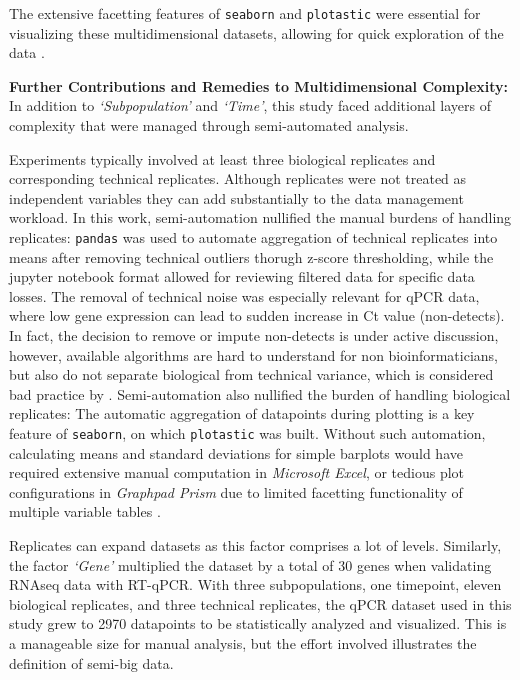 The extensive facetting features of \texttt{seaborn} and \texttt{plotastic} were
essential for visualizing these multidimensional datasets, allowing for quick
exploration of the data \cite{waskomSeabornStatisticalData2021}.


\textbf{Further Contributions and Remedies to Multidimensional Complexity:}
In addition to \textit{`Subpopulation'} and \textit{`Time'}, this study faced
additional layers of complexity that were managed through semi-automated
analysis.

Experiments typically involved at least three biological replicates
and corresponding technical replicates. Although replicates were not treated as
independent variables 
they can add substantially to the data management workload. In this work,
semi-automation nullified the manual burdens of handling replicates:
\texttt{pandas} was used to automate aggregation of technical replicates into
means after removing technical outliers thorugh z-score thresholding, while the
jupyter notebook format allowed for reviewing filtered data for specific data
losses. The removal of technical noise was especially relevant for qPCR data,
where low gene expression can lead to sudden increase in Ct value
(non-detects). In fact, the decision to remove or impute non-detects is under
active discussion, however, available algorithms are hard to understand for non
bioinformaticians, but also do not separate biological from technical variance,
which is considered bad practice by
\citet{motulskyIntuitiveBiostatisticsNonmathematical2018}
\cite{mccallNondetectsQPCRData2014, sherinaMultipleImputationDirect2020}.
Semi-automation also nullified the burden of handling biological replicates: The
automatic aggregation of datapoints during plotting is a key feature of
\texttt{seaborn}, on which \texttt{plotastic} was built. Without such
automation, calculating means and standard deviations for simple barplots would
have required extensive manual computation in \textit{Microsoft Excel}, or
tedious plot configurations in \textit{Graphpad Prism} due to limited facetting
functionality of multiple variable tables \cite{GraphPadPrism102024}.

Replicates can expand datasets as this factor comprises a lot of levels.
Similarly, the factor \textit{`Gene'} multiplied the dataset by a total of 30
genes when validating RNAseq data with RT-qPCR. With three subpopulations, one
timepoint, eleven biological replicates, and three technical replicates, the
qPCR dataset used in this study grew to 2970 datapoints to be statistically
analyzed and visualized. This is a manageable size for manual analysis, but the
effort involved illustrates the definition of semi-big data.

